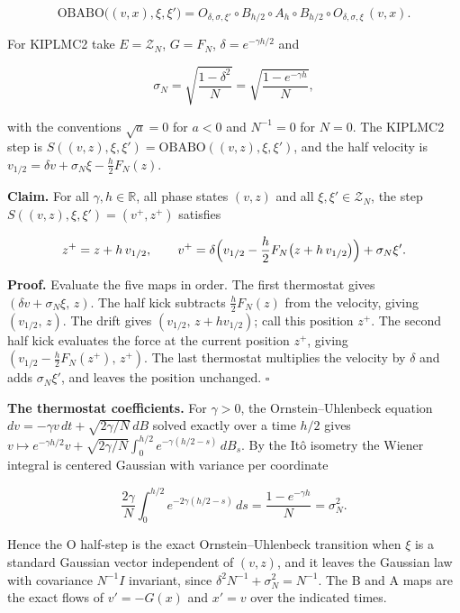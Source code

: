\documentclass[11pt,a4paper]{article}
\begin{document}
\[\mathrm{OBABO}\bigl((v,x),\xi,\xi'\bigr)=O_{\delta,\sigma,\xi'}\circ B_{h/2}\circ A_h\circ B_{h/2}\circ O_{\delta,\sigma,\xi}\,(v,x).\]


For KIPLMC2 take \(E=\mathcal Z_N\), \(G=F_N\), \(\delta=e^{-\gamma h/2}\) and


\[\sigma_N=\sqrt{\frac{1-\delta^2}N}=\sqrt{\frac{1-e^{-\gamma h}}N},\]


with the conventions \(\sqrt a=0\) for \(a<0\) and \(N^{-1}=0\) for \(N=0\). The KIPLMC2 step is \(S((v,z),\xi,\xi')=\mathrm{OBABO}((v,z),\xi,\xi')\), and the half velocity is \(v_{1/2}=\delta v+\sigma_N\xi-\frac h2F_N(z)\).




\textbf{Claim.} For all \(\gamma,h\in\mathbb R\), all phase states \((v,z)\) and all \(\xi,\xi'\in\mathcal Z_N\), the step \(S((v,z),\xi,\xi')=(v^+,z^+)\) satisfies


\[z^+=z+h\,v_{1/2},\qquad v^+=\delta\Bigl(v_{1/2}-\frac h2F_N\bigl(z+h\,v_{1/2}\bigr)\Bigr)+\sigma_N\xi'.\]


\textbf{Proof.} Evaluate the five maps in order. The first thermostat gives \((\delta v+\sigma_N\xi,\,z)\). The half kick subtracts \(\frac h2F_N(z)\) from the velocity, giving \((v_{1/2},\,z)\). The drift gives \((v_{1/2},\,z+hv_{1/2})\); call this position \(z^+\). The second half kick evaluates the force at the current position \(z^+\), giving \((v_{1/2}-\frac h2F_N(z^+),\,z^+)\). The last thermostat multiplies the velocity by \(\delta\) and adds \(\sigma_N\xi'\), and leaves the position unchanged. \(\square\)




\textbf{The thermostat coefficients.} For \(\gamma>0\), the Ornstein–Uhlenbeck equation \(dv=-\gamma v\,dt+\sqrt{2\gamma/N}\,dB\) solved exactly over a time \(h/2\) gives \(v\mapsto e^{-\gamma h/2}v+\sqrt{2\gamma/N}\int_0^{h/2}e^{-\gamma(h/2-s)}\,dB_s\). By the Itô isometry the Wiener integral is centered Gaussian with variance per coordinate


\[\frac{2\gamma}N\int_0^{h/2}e^{-2\gamma(h/2-s)}\,ds=\frac{1-e^{-\gamma h}}N=\sigma_N^2.\]


Hence the O half-step is the exact Ornstein–Uhlenbeck transition when \(\xi\) is a standard Gaussian vector independent of \((v,z)\), and it leaves the Gaussian law with covariance \(N^{-1}I\) invariant, since \(\delta^2N^{-1}+\sigma_N^2=N^{-1}\). The B and A maps are the exact flows of \(v'=-G(x)\) and \(x'=v\) over the indicated times.
\end{document}
